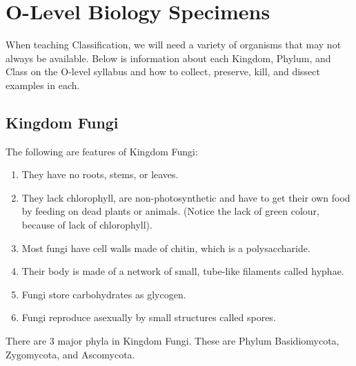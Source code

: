 \pagebreak

\setcounter{secnumdepth}{3}


\section{O-Level Biology Specimens}

When teaching Classification, we will need a variety of organisms that may not always be available. Below is information about each Kingdom, Phylum, and Class on the O-level syllabus  and how to collect, preserve, kill, and dissect examples in each.

\subsection{Kingdom Fungi}
The following are features of Kingdom Fungi:
\begin{enumerate}
\item{They have no roots, stems, or leaves.}
\item{They lack chlorophyll, are non-photosynthetic and have to get their own food by feeding on dead plants or animals. (Notice the lack of green colour, because of lack of chlorophyll)}.
\item{Most fungi have cell walls made of chitin, which is a polysaccharide.}
\item{Their body is made of a network of small, tube-like filaments called hyphae.}
\item{Fungi store carbohydrates as glycogen.}
\item{Fungi reproduce asexually by small structures called spores.} 
\end{enumerate}

There are 3 major phyla in Kingdom Fungi. These are Phylum Basidiomycota, Zygomycota, and Ascomycota.

